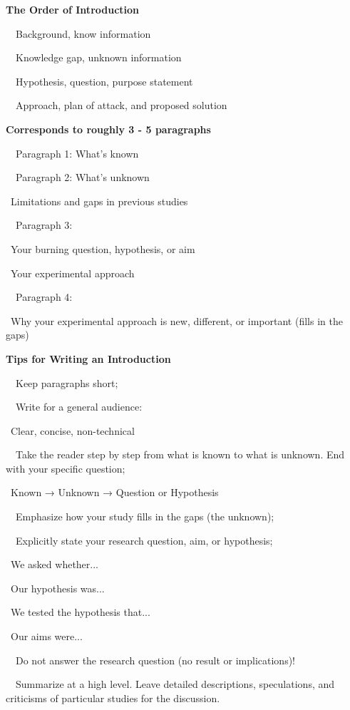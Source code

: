 \documentclass[a4paper, 12pt]{article}
\begin{document}
\textbf{The Order of Introduction}
\par\ \textbullet\ Background, know information
\par\ \textbullet\ Knowledge gap, unknown information
\par\ \textbullet\ Hypothesis, question, purpose statement
\par\ \textbullet\ Approach, plan of attack, and proposed solution

\textbf{Corresponds to roughly 3 - 5 paragraphs}
\par\ \textbullet\ Paragraph 1: What's known
\par\ \textbullet\ Paragraph 2: What's unknown
\par\quad\textopenbullet\ Limitations and gaps in previous studies
\par\ \textbullet\ Paragraph 3:
\par\quad\textopenbullet\ Your burning question, hypothesis, or aim
\par\quad\textopenbullet\ Your experimental approach
\par\ \textbullet\ Paragraph 4:
\par\quad\textopenbullet\ Why your experimental approach is new, different, or important (fills in the gaps)

\newpage\textbf{Tips for Writing an Introduction}
\par\ \textbullet\ Keep paragraphs short;
\par\ \textbullet\ Write for a general audience:
\par\quad\textopenbullet\ Clear, concise, non-technical
\par\ \textbullet\ Take the reader step by step from what is known to what is unknown. End with your specific question;
\par\quad\textopenbullet\ Known → Unknown → Question or Hypothesis
\par\ \textbullet\ Emphasize how your study fills in the gaps (the unknown);
\par\ \textbullet\ Explicitly state your research question, aim, or hypothesis;
\par\quad\textopenbullet\ We asked whether...
\par\quad\textopenbullet\ Our hypothesis was...
\par\quad\textopenbullet\ We tested the hypothesis that...
\par\quad\textopenbullet\ Our aims were...
\par\ \textbullet\ Do not answer the research question (no result or implications)!
\par\ \textbullet\ Summarize at a high level. Leave detailed descriptions, speculations, and criticisms of particular studies for the discussion.
\end{document}
